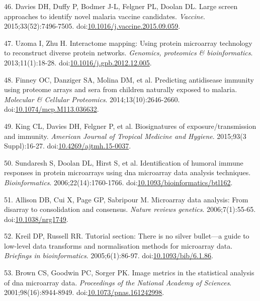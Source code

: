 \documentclass[a4paper]{article}
\begin{document}
\hypertarget{ref-Davies2015Large}{}
46. Davies DH, Duffy P, Bodmer J-L, Felgner PL, Doolan DL. Large screen
approaches to identify novel malaria vaccine candidates. \emph{Vaccine}.
2015;33(52):7496-7505.
doi:\href{https://doi.org/10.1016/j.vaccine.2015.09.059}{10.1016/j.vaccine.2015.09.059}.

\hypertarget{ref-uzoma2013interactome}{}
47. Uzoma I, Zhu H. Interactome mapping: Using protein microarray
technology to reconstruct diverse protein networks. \emph{Genomics,
proteomics \& bioinformatics}. 2013;11(1):18-28.
doi:\href{https://doi.org/10.1016/j.gpb.2012.12.005}{10.1016/j.gpb.2012.12.005}.

\hypertarget{ref-Finney2014}{}
48. Finney OC, Danziger SA, Molina DM, et al. Predicting antidisease
immunity using proteome arrays and sera from children naturally exposed
to malaria. \emph{Molecular \& Cellular Proteomics}.
2014;13(10):2646-2660.
doi:\href{https://doi.org/10.1074/mcp.M113.036632}{10.1074/mcp.M113.036632}.

\hypertarget{ref-King2015FOC}{}
49. King CL, Davies DH, Felgner P, et al. Biosignatures of
exposure/transmission and immunity. \emph{American Journal of Tropical
Medicine and Hygiene}. 2015;93(3 Suppl):16-27.
doi:\href{https://doi.org/10.4269/ajtmh.15-0037}{10.4269/ajtmh.15-0037}.

\hypertarget{ref-sundaresh2006}{}
50. Sundaresh S, Doolan DL, Hirst S, et al. Identification of humoral
immune responses in protein microarrays using dna microarray data
analysis techniques. \emph{Bioinformatics}. 2006;22(14):1760-1766.
doi:\href{https://doi.org/10.1093/bioinformatics/btl162}{10.1093/bioinformatics/btl162}.

\hypertarget{ref-allison2006}{}
51. Allison DB, Cui X, Page GP, Sabripour M. Microarray data analysis:
From disarray to consolidation and consensus. \emph{Nature reviews
genetics}. 2006;7(1):55-65.
doi:\href{https://doi.org/10.1038/nrg1749}{10.1038/nrg1749}.

\hypertarget{ref-kreil2005bullet}{}
52. Kreil DP, Russell RR. Tutorial section: There is no silver
bullet---a guide to low-level data transforms and normalisation methods
for microarray data. \emph{Briefings in bioinformatics}.
2005;6(1):86-97.
doi:\href{https://doi.org/10.1093/bib/6.1.86}{10.1093/bib/6.1.86}.

\hypertarget{ref-brown2001image}{}
53. Brown CS, Goodwin PC, Sorger PK. Image metrics in the statistical
analysis of dna microarray data. \emph{Proceedings of the National
Academy of Sciences}. 2001;98(16):8944-8949.
doi:\href{https://doi.org/10.1073/pnas.161242998}{10.1073/pnas.161242998}.
\end{document}
